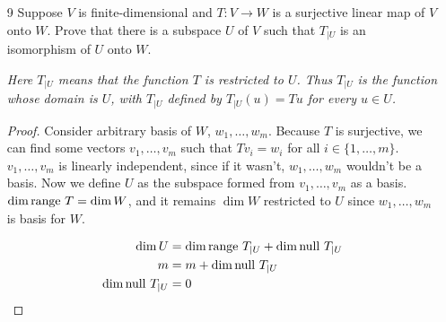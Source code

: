 \begin{enumerate}
\begin{proof}
        We will show that $S$ and $T$ are injective in $U$. Suppose that there is some $u_1, u_2$ such that $Su_1 = Su_2$. Then, we would have $S(u_1 - u_2) = 0$, but $u_1 - u_2$ is in $\lnull S$. The only element in both $U$ and $\lnull S$ is 0, therefore $u_1 - u_2 = 0$ and $u_1 = u_2$. Same logic applies to $T$.
        
        Since $T$ is injective in $U$, $Tu_1, \dots, Tu_m$ are linearly independent in $W$. We can arbitrarily extend this to a basis $Tu_1, \dots, Tu_m, w_1, \dots w_r$, where $\dim W = m + r$. We also define a basis $Su_1, \dots, Su_m, p_1, \dots, p_r$ using the same principle.
        
        Now we can define $E$. 

        \[E(Tu_i) = Su_i\]

        and 

        \[E(w_i) = p_i\]

        $E$ is well defined because $Tu_1, \dots, Tu_m, w_1, \dots, w_r$ is a basis in $W$. 
        
        $E$ is invertible because $Su_1, \dots, Su_m, p_1, \dots, p_r$ is a basis in $W$. $S = ET$ because the bases all map to the same values (no I will not show it but it is obvious).
    \end{proof}

    \item[9] Suppose $V$ is finite-dimensional and $T: V \to W$ is a surjective linear map of $V$ onto $W$. Prove that there is a subspace $U$ of $V$ such that $T_{|U}$ is an isomorphism of $U$ onto $W$. 
    
    \quad \emph{Here $T_{|U}$ means that the function $T$ is restricted to $U$. Thus $T_{|U}$ is the function whose domain is $U$, with $T_{|U}$ defined by $T_{|U}(u) = Tu$ for every $u \in U$.}

    \begin{proof}
        Consider arbitrary basis of $W$, $w_1, \dots, w_m$. Because $T$ is surjective, we can find some vectors $v_1, \dots, v_m$ such that $Tv_i = w_i$ for all $i \in \{1, \dots, m\}$. $v_1, \dots, v_m$ is linearly independent, since if it wasn't, $w_1, \dots, w_m$ wouldn't be a basis. Now we define $U$ as the subspace formed from $v_1, \dots, v_m$ as a basis. $\dim \text{range } T = \dim W$, and it remains $\dim W$ restricted to $U$ since $w_1, \dots, w_m$ is basis for $W$.


        \begin{align*}
            \dim U &= \dim \text{range } T_{|U} + \dim \text{null } T_{|U} \\
            m &= m + \dim \text{null } T_{|U} \\
            \dim \text{null } T_{|U} &= 0
        \end{align*}


\end{proof}
\end{enumerate}
